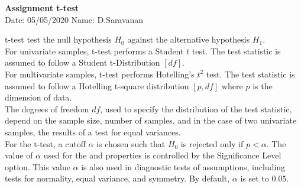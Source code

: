 \documentclass[a4paper,11pt,openright]{report}
\begin{document}
\singlespacing
\pagestyle{plain}

\begin{center}
\textbf{Assignment t-test} \\
Date: 05/05/2020 \hspace{2mm} Name: D.Saravanan
\end{center}

\vspace{10px}

\begin{adjustwidth}{12mm}{12mm}

t-test test the null hypothesis $H_{0}$ against the alternative hypothesis $H_{1}$. \\

For univariate samples, t-test performs a Student $t$ test. The test statistic is assumed to
follow a Student t-Distribution $[df]$. \\ 

For multivariate samples, t-test performs Hotelling's $t^{2}$ test. The test statistic is
assumed to follow a Hotelling t-square distribution $[p,df]$ where $p$ is the dimension of
data. \\

The degrees of freedom $df$, used to specify the distribution of the test statistic, depend 
on the sample size, number of samples, and in the case of two univariate samples, the 
results of a test for equal variances. \\ 

For the t-test, a cutoff $\alpha$ is chosen such that $H_{0}$ is rejected only if $p < 
\alpha$. The value of $\alpha$ used for the  and  properties is controlled by the Significance Level option. This value $\alpha$ 
is also used in diagnostic tests of assumptions, including tests for normality, equal 
variance, and symmetry. By default, $\alpha$ is set to $0.05$. \\

\end{adjustwidth}
\end{document}
